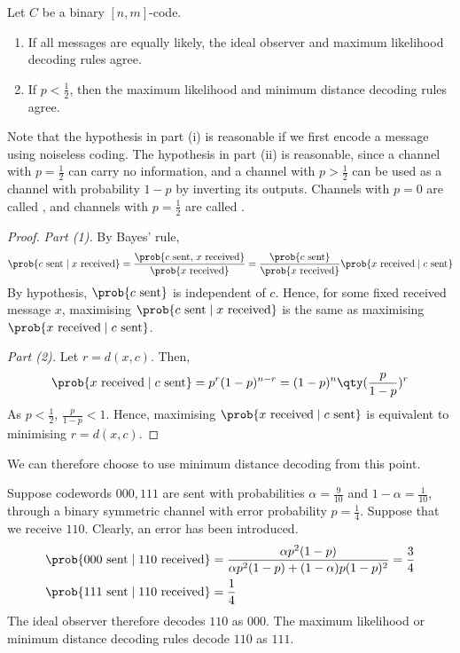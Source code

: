 \begin{lemma}
    Let $C$ be a binary $[n,m]$-code.
    \begin{enumerate}
        \item If all messages are equally likely, the ideal observer and maximum likelihood decoding rules agree.
        \item If $p < \frac{1}{2}$, then the maximum likelihood and minimum distance decoding rules agree.
    \end{enumerate}
\end{lemma}
Note that the hypothesis in part (i) is reasonable if we first encode a message using noiseless coding.
The hypothesis in part (ii) is reasonable, since a channel with $p = \frac{1}{2}$ can carry no information, and a channel with $p > \frac{1}{2}$ can be used as a channel with probability $1 - p$ by inverting its outputs.
Channels with $p = 0$ are called , and channels with $p = \frac{1}{2}$ are called .
\begin{proof}
    \emph{Part (1).}
    By Bayes' rule,
    \begin{align*}
            \prob{c \text{ sent} \mid x \text{ received}} = \frac{\prob{c \text{ sent, } x \text{ received}}}{\prob{x \text{ received}}} = \frac{\prob{c \text{ sent}}}{\prob{x \text{ received}}} \prob{x \text{ received} \mid c \text{ sent}}
    \end{align*}
    By hypothesis, $\prob{c \text{ sent}}$ is independent of $c$.
    Hence, for some fixed received message $x$, maximising $\prob{c \text{ sent} \mid x \text{ received}}$ is the same as maximising $\prob{x \text{ received} \mid c \text{ sent}}$.

    \emph{Part (2).}
    Let $r = d(x,c)$.
    Then,
    \begin{align*}
        \prob{x \text{ received} \mid c \text{ sent}} = p^r (1-p)^{n-r} = (1-p)^n \qty(\frac{p}{1-p})^r
    \end{align*}
    As $p < \frac{1}{2}$, $\frac{p}{1-p} < 1$.
    Hence, maximising $\prob{x \text{ received} \mid c \text{ sent}}$ is equivalent to minimising $r = d(x,c)$.
\end{proof}

We can therefore choose to use minimum distance decoding from this point.

\begin{example}
    Suppose codewords $000, 111$ are sent with probabilities $\alpha = \frac{9}{10}$ and $1 - \alpha = \frac{1}{10}$, through a binary symmetric channel with error probability $p = \frac{1}{4}$.
    Suppose that we receive $110$.
    Clearly, an error has been introduced.
    \begin{align*}
        \prob{000 \text{ sent} \mid 110 \text{ received}} &= \frac{\alpha p^2 (1-p)}{\alpha p^2 (1-p) + (1-\alpha)p(1-p)^2} = \frac{3}{4} \\
        \prob{111 \text{ sent} \mid 110 \text{ received}} &= \frac{1}{4}
    \end{align*}
    The ideal observer therefore decodes $110$ as $000$.
    The maximum likelihood or minimum distance decoding rules decode $110$ as $111$.
\end{example}

